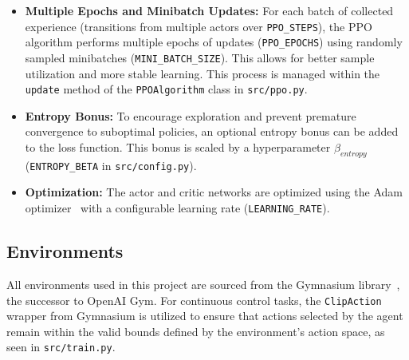 \begin{itemize}
    \item \textbf{Multiple Epochs and Minibatch Updates:} For each batch of collected experience (transitions from multiple actors over \texttt{PPO\_STEPS}), the PPO algorithm performs multiple epochs of updates (\texttt{PPO\_EPOCHS}) using randomly sampled minibatches (\texttt{MINI\_BATCH\_SIZE}). This allows for better sample utilization and more stable learning. This process is managed within the \texttt{update} method of the \texttt{PPOAlgorithm} class in \texttt{src/ppo.py}.

    \item \textbf{Entropy Bonus:} To encourage exploration and prevent premature convergence to suboptimal policies, an optional entropy bonus can be added to the loss function. This bonus is scaled by a hyperparameter $\beta_{entropy}$ (\texttt{ENTROPY\_BETA} in \texttt{src/config.py}).

    \item \textbf{Optimization:} The actor and critic networks are optimized using the Adam optimizer~\cite{kingma2014adam} with a configurable learning rate (\texttt{LEARNING\_RATE}).
\end{itemize}

\subsection{Environments}
All environments used in this project are sourced from the Gymnasium library~\cite{gymnasium2023}, the successor to OpenAI Gym. For continuous control tasks, the \texttt{ClipAction} wrapper from Gymnasium is utilized to ensure that actions selected by the agent remain within the valid bounds defined by the environment's action space, as seen in \texttt{src/train.py}.

